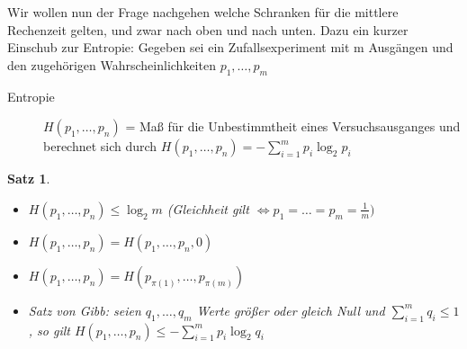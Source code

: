 \documentclass[ngerman,draft,parskip=half*,twoside]{scrreprt}
\theoremstyle{break}
\newtheorem{satz}{Satz}[chapter]
\theoremstyle{nonumberbreak}
\begin{document}
Wir wollen nun der Frage nachgehen welche Schranken für die mittlere Rechenzeit gelten, und zwar nach oben und nach unten.
Dazu ein kurzer Einschub zur Entropie:
Gegeben sei ein Zufallsexperiment mit m Ausgängen und den zugehörigen Wahrscheinlichkeiten $p_1,\ldots,p_m$
\begin{description}
    \item[Entropie] $H(p_1,\ldots,p_n)$ = Maß für die Unbestimmtheit eines Versuchsausganges und berechnet sich durch
     $H(p_1,\ldots,p_n)=-\sum_{i=1}^m p_i\log_2 p_i$
\end{description}

\begin{satz}
 \begin{itemize}
    \item $H(p_1,\ldots,p_n)\leq\log_2 m$ (Gleichheit gilt
      $\Leftrightarrow p_1=\ldots=p_m=\frac{1}{m})$
    \item $H(p_1,\ldots,p_n) = H(p_1,\ldots,p_n,0)$
    \item $H(p_1,\ldots,p_n)=H(p_{\pi(1)},\ldots,p_{\pi(m)})$
    \item Satz von Gibb: seien $q_1,\ldots,q_m$ Werte größer oder gleich Null und $\sum_{i=1}^m q_i\leq1$, so gilt
     $H(p_1,\ldots,p_n)\leq-\sum_{i=1}^m p_i\log_2q_i$
 \end{itemize}
\end{satz}
\end{document}
